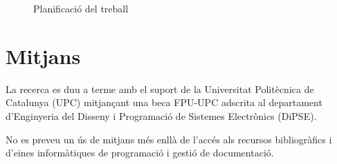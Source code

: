 \begin{figure}[tp]
\centering
{}
\caption{Planificació del treball}
\label{fig:pla:futur}
\end{figure}


\section{Mitjans}

La recerca es duu a terme amb el suport de la Universitat Politècnica
de Catalunya (UPC) mitjançant una beca FPU-UPC adscrita al departament
d'Enginyeria del Disseny i Programació de Sistemes Electrònics
(DiPSE).


No es preveu un ús de mitjans més enllà de l'accés als
recursos bibliogràfics i d'eines informàtiques de programació i
gestió de documentació.










